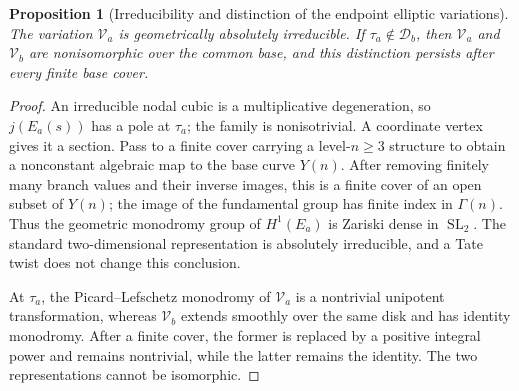 \documentclass[11pt,a4paper,oneside]{article}
\theoremstyle{plain}
\newtheorem{proposition}[theorem]{Proposition}
\theoremstyle{definition}
\theoremstyle{remark}
\numberwithin{equation}{section}
\begin{document}
\begin{proposition}[Irreducibility and distinction of the endpoint elliptic variations]\label{unified:prop:seriesirred}
The variation $\mathcal V_a$ is geometrically absolutely irreducible.
If $\tau_a\notin\mathcal D_b$, then $\mathcal V_a$ and $\mathcal V_b$
are nonisomorphic over the common base, and this distinction persists after every finite base cover.
\end{proposition}
\begin{proof}
An irreducible nodal cubic is a multiplicative degeneration, so $j(E_a(s))$ has a pole at $\tau_a$;
the family is nonisotrivial. A coordinate vertex gives it a section.
Pass to a finite cover carrying a level-$n\ge3$ structure to obtain a nonconstant algebraic map to the base curve $Y(n)$.
After removing finitely many branch values and their inverse images, this is a finite cover of an open subset of $Y(n)$;
the image of the fundamental group has finite index in $\Gamma(n)$.
Thus the geometric monodromy group of $H^1(E_a)$ is Zariski dense in $\operatorname{SL}_2$.
The standard two-dimensional representation is absolutely irreducible, and a Tate twist does not change this conclusion.

At $\tau_a$, the Picard--Lefschetz monodromy of $\mathcal V_a$ is a nontrivial unipotent transformation,
whereas $\mathcal V_b$ extends smoothly over the same disk and has identity monodromy.
After a finite cover, the former is replaced by a positive integral power and remains nontrivial,
while the latter remains the identity. The two representations cannot be isomorphic.
\end{proof}
\end{document}

